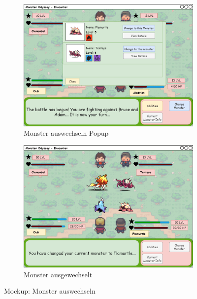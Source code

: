 \begin{figure}[H]
    \centering
    \begin{subfigure}[b]{0.4\textwidth}
        \includegraphics[width=\textwidth]{images/mockups/Encounter/Encounter2v2ChangeMonsterPopup.png}
        \caption{Monster auswechseln Popup}
        \label{fig: Monster wechseln Popup}
    \end{subfigure}
    \hfill
    \begin{subfigure}[b]{0.4\textwidth}
        \includegraphics[width=\textwidth]{images/mockups/Encounter/Encounter2v2ChangeMonster.png}
        \caption{Monster ausgewechselt}
        \label{fig: Monster ausgewechselt}
    \end{subfigure}
    \caption{Mockup: Monster auswechseln}
    \label{fig: Monster auswechseln}
\end{figure}
